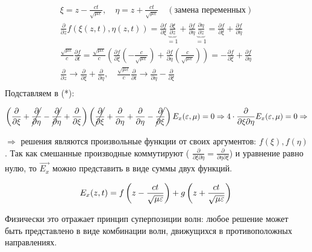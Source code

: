 \documentclass[12pt, a4paper]{report}
\begin{document}
\begin{gather*}
    \xi = z - \frac{c t}{ \sqrt{\mu \varepsilon} }, \quad \eta = z + \frac{c t}{ \sqrt{\mu \varepsilon} } \quad ( \text{замена переменных} )  \\
    \frac{\partial}{\partial z } f ( \xi ( z,t), \eta(z,t) ) = \frac{\partial f}{\partial \xi }  \underbrace{\frac{\partial \xi }{\partial z }}_{=1} + \frac{\partial f }{\partial \eta  }   \underbrace{\frac{\partial \eta }{\partial z }}_{=1}= \frac{\partial f}{\partial \xi } + \frac{\partial f}{ \partial \eta } \\
    \frac{\sqrt{\mu \varepsilon}}{c}  \frac{\partial f }{\partial t}      = \frac{\sqrt{\mu \varepsilon}}{c} \left( \frac{\partial f }{\partial \xi } \left( - \frac{c}{\sqrt{\mu \varepsilon}}\right) + \frac{\partial f}{\partial \eta } \left( \frac{c}{\sqrt{\mu \varepsilon}}  \right)  \right)=- \frac{\partial f}{\partial \xi } + \frac{\partial f}{ \partial \eta }  \\ 
    \frac{\partial}{\partial z } \to  \frac{\partial}{\partial \xi } + \frac{\partial}{\partial \eta }, \quad \frac{\sqrt{\mu \varepsilon}}{c}\frac{\partial}{\partial t} \to \frac{\partial}{\partial \eta }- \frac{\partial }{\partial \xi } \\
\end{gather*} 
Подставляем в (*):

\[     \left( \frac{\partial }{\partial \xi  }+ \cancel{\frac{\partial}{\partial \eta }}  - \cancel{\frac{\partial}{\partial \eta }}  + \frac{\partial}{\partial \xi  }     \right) \left( \cancel{\frac{\partial}{\partial \xi }}  +\frac{\partial}{\partial \eta } +\frac{\partial}{\partial \eta } - \cancel{\frac{\partial}{\partial \xi }}  \right) E_x ( \varepsilon,\mu)= 0 \Rightarrow  4 \cdot \frac{\partial}{ \partial \xi \partial \eta }E_x ( \varepsilon,\mu)= 0 \Rightarrow   \] 

\( \Rightarrow  \) решения являются произвольные функции от своих аргументов: \( f(\xi) , f(\eta) \).
Так как смешанные производные коммутируют ( \(\displaystyle  \frac{\partial}{\partial \xi \partial \eta}= \frac{\partial}{\partial \eta \partial \xi}   \)) и уравнение равно нулю, то \( \vec{E_x} \) можно представить в виде суммы двух функций.

\[     E_x (z,t) = f \left(z- \frac{ct}{\sqrt{ \mu \varepsilon }}   \right)+ g \left(  z+ \frac{ct}{\sqrt{ \mu \varepsilon }} \right) \\ 
\] 



Физически это отражает принцип суперпозиции волн: любое решение может быть представлено в виде комбинации волн, движущихся в противоположных направлениях.
\end{document}
